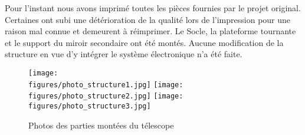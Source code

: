 Pour l'instant nous avons imprimé toutes les pièces fournies par le projet original. Certaines ont subi une détérioration de la qualité lors de l'impression pour une raison mal connue et demeurent à réimprimer. Le Socle, la plateforme tournante et le support du miroir secondaire ont été montés. Aucune modification de la structure en vue d'y intégrer le système électronique n'a été faite.

\begin{figure}[H]
    \centering
    \texttt{[image: \\figures/photo\_structure1.jpg]}
    \texttt{[image: \\figures/photo\_structure2.jpg]}
    \texttt{[image: \\figures/photo\_structure3.jpg]}
    \decoRule
    \caption[
    Photos des parties montées du télescope]{
    Photos des parties montées du télescope}
    \label{fig:Photos des parties montées du télescope}
    \end{figure}

